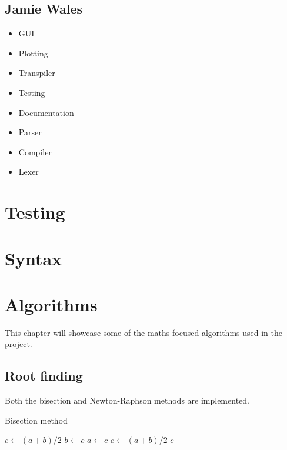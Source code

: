 \documentclass[a4paper, oneside, 11pt]{report}
\begin{document}
\section{Jamie Wales}\label{sec:jamie-wales}

\begin{itemize}
    \item GUI
    \item Plotting
    \item Transpiler
    \item Testing
    \item Documentation
    \item Parser
    \item Compiler
    \item Lexer
\end{itemize}

\chapter{Testing}\label{ch:test}



\chapter{Syntax}\label{ch:other-stuff}
    
\chapter{Algorithms}\label{ch:algorithms}
    
This chapter will showcase some of the maths focused algorithms used in the project.
    
\section{Root finding}\label{sec:root-finding}

Both the bisection and Newton-Raphson methods are implemented.
    
\begin{algorithm}
    \caption{Bisection method}
    \begin{algorithmic}
            \State $c \gets (a + b) / 2$
                    \State $b \gets c$
                \Else
                    \State $a \gets c$
                \EndIf
                \State $c \gets (a + b) / 2$
            \EndWhile
            \State \Return $c$
        \EndFunction
    \end{algorithmic}\label{alg:algorithm2}
\end{algorithm}
\end{document}
